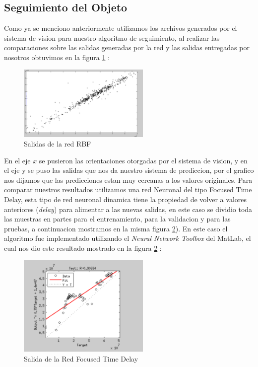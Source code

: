 \documentclass[conference]{IEEEtran}
\begin{document}
\subsection{Seguimiento del Objeto}
Como  ya se menciono anteriormente utilizamos los archivos generados por el sistema de vision para nuestro algoritmo de seguimiento, al realizar las comparaciones sobre las salidas generadas por la red y las salidas entregadas por nosotros obtuvimos  en la figura  \ref{fig_salrbf} :
\begin{figure}
	\centering
	\includegraphics[width=2.5in]{salidaRBF.pdf}
	\caption{Salidas de la red RBF}
	\label{fig_salrbf}
\end{figure}
En el eje $x$ se pusieron las orientaciones otorgadas por el sistema de vision, y en el eje y se puso las salidas que nos da nuestro sistema de prediccion, por el grafico nos dijamos que las predicciones estan muy cercanas a los valores originales.
Para comparar nuestros resultados utilizamos una red Neuronal del tipo Focused Time Delay, esta tipo de red neuronal dinamica tiene la propiedad de volver a valores anteriores (\textit{delay}) para alimentar a las nuevas salidas, en este caso se dividio toda las muestras en partes para el entrenamiento, para la validacion y para las pruebas, a continuacion mostramos en la misma figura  \ref{fig_salmat}). En este caso el algoritmo fue implementado utilizando el  \textit{Neural Network Toolbox} del MatLab, el cual nos dio este resultado mostrado en la figura \ref{fig_salmat} :
\begin{figure}
	\centering
	\includegraphics[width=2.5in]{salidaNAR.pdf}
	\caption{Salida de la Red Focused Time Delay}
	\label{fig_salmat}
\end{figure}
\end{document}
